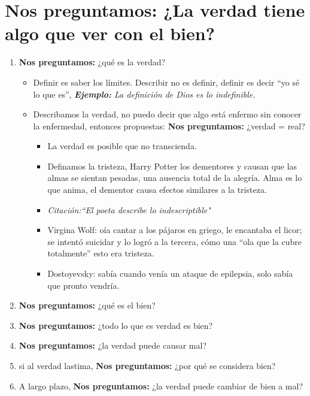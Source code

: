 \section{\textbf{Nos preguntamos:} ¿La verdad tiene algo que ver con el bien?}
\begin{enumerate}
    \item \textbf{Nos preguntamos:} ¿qué es la verdad?
        \begin{itemize}
            \item Definir es saber los límites. Describir no es definir, definir es decir ``yo sé lo que es'', \emph{\textbf{Ejemplo: }La definición de Dios es lo indefinible.}
            \item Describamos la verdad, no puedo decir que algo está enfermo sin conocer la enfermedad, entonces propuestas: \textbf{Nos preguntamos:} ¿verdad = real?
                \begin{itemize}
                    \item La verdad es posible que no transcienda.
                    \item Definamos la tristeza, Harry Potter los dementores y causan que las almas se sientan pesadas, una ausencia total de la alegría. Alma es lo que anima, el dementor causa efectos similares a la tristeza.
                    \item \emph{Citación:``El poeta describe lo indescriptible"}
                    \item Virgina Wolf: oía cantar a los pájaros en griego, le encantaba el licor; se intentó suicidar y lo logró a la tercera, cómo una ``ola que la cubre totalmente'' esto era tristeza.
                    \item Dostoyevsky: sabía cuando venía un ataque de epilepsia, solo sabía que pronto vendría.
                \end{itemize}
        \end{itemize}

    \item \textbf{Nos preguntamos:} ¿qué es el bien?
    \item \textbf{Nos preguntamos:} ¿todo lo que es verdad es bien?
    \item \textbf{Nos preguntamos:} ¿la verdad puede causar mal?
    \item si al verdad lastima, \textbf{Nos preguntamos:} ¿por qué se considera bien?
    \item A largo plazo, \textbf{Nos preguntamos:} ¿la verdad puede cambiar de bien a mal?
\end{enumerate}

